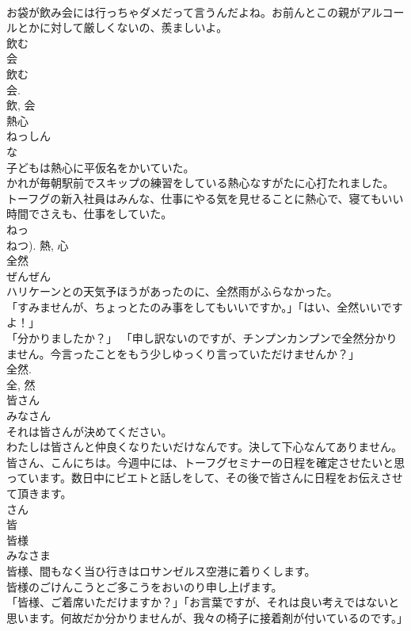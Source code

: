 \documentclass[8pt]{extreport}
\begin{document}
\begin{CJK}{UTF8}{min}
\\	お袋が飲み会には行っちゃダメだって言うんだよね。お前んとこの親がアルコールとかに対して厳しくないの、羨ましいよ。	
\\	飲む 
\\	会 
\\	飲む 
\\	会. 
\\	飲, 会	
\\	熱心	
\\	ねっしん	
\\	な 
\\	子どもは熱心に平仮名をかいていた。	
\\	かれが毎朝駅前でスキップの練習をしている熱心なすがたに心打たれました。	
\\	トーフグの新入社員はみんな、仕事にやる気を見せることに熱心で、寝てもいい時間でさえも、仕事をしていた。	
\\	ねっ 
\\	ねつ).	熱, 心	
\\	全然	
\\	ぜんぜん	
\\	ハリケーンとの天気予ほうがあったのに、全然雨がふらなかった。	
\\	「すみませんが、ちょっとたのみ事をしてもいいですか。」「はい、全然いいですよ！」	
\\	「分かりましたか？」 「申し訳ないのですが、チンプンカンプンで全然分かりません。今言ったことをもう少しゆっくり言っていただけませんか？」	
\\	全然. 
\\	全, 然	
\\	皆さん	
\\	みなさん	
\\	それは皆さんが決めてください。	
\\	わたしは皆さんと仲良くなりたいだけなんです。決して下心なんてありません。	
\\	皆さん、こんにちは。今週中には、トーフグセミナーの日程を確定させたいと思っています。数日中にビエトと話しをして、その後で皆さんに日程をお伝えさせて頂きます。	
\\	さん 
\\	皆	
\\	皆様	
\\	みなさま	
\\	皆様、間もなく当ひ行きはロサンゼルス空港に着りくします。	
\\	皆様のごけんこうとご多こうをおいのり申し上げます。	
\\	「皆様、ご着席いただけますか？」「お言葉ですが、それは良い考えではないと思います。何故だか分かりませんが、我々の椅子に接着剤が付いているのです。」	

\end{CJK}
\end{document}
